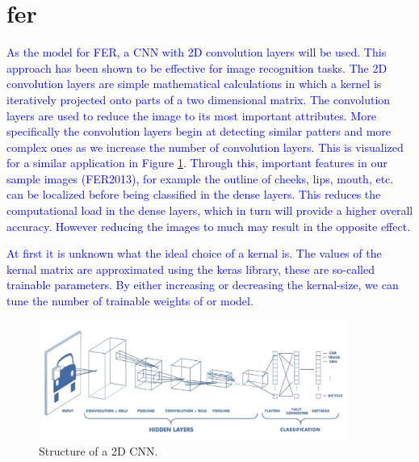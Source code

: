 \section{\acrlong{fer}}
\textcolor{blue}{As the model for FER, a CNN with 2D convolution layers will be used. This approach has been shown to be effective for image recognition tasks. 
The 2D convolution layers are simple mathematical calculations in which a kernel is iteratively projected onto parts of a two dimensional matrix.
The convolution layers are used to reduce the image to its most important attributes. More specifically the convolution layers begin at detecting  similar patters and more complex ones as we increase the number of convolution layers.  This is visualized for a similar application in Figure \ref{fig:con2dart}. Through this, important features in our sample images (FER2013), for example the outline of cheeks, lips, mouth, etc. can be localized before being classified in the dense layers. This reduces the computational load in the dense layers, which in turn will provide a higher overall accuracy. However reducing the images to much may result in the opposite effect. }

\textcolor{blue}{At first it is unknown what the ideal choice of a kernal is. The values of the kernal matrix are approximated using the keras library, these are so-called trainable parameters. By either increasing or decreasing the kernal-size, we can tune the number of trainable weights of or model. }

\begin{figure}[h]
\centering
\includegraphics[width=0.9\textwidth]{images/conv2d2.png}
\caption{Structure of a 2D CNN. \cite{con2dart}}\label{fig:con2dart}
\end{figure}

